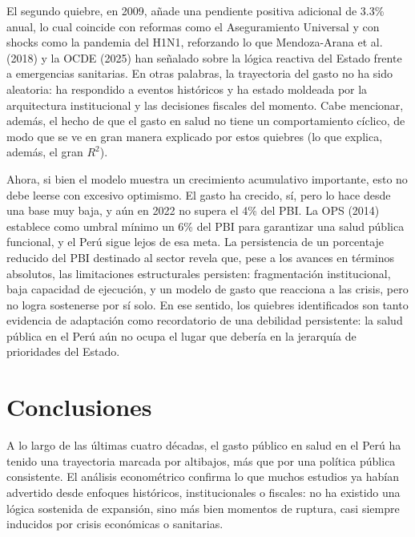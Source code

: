 \documentclass[12pt]{article}
\begin{document}
El segundo quiebre, en 2009, añade una pendiente positiva adicional de 3.3\% anual, lo cual coincide con reformas como el Aseguramiento Universal y con shocks como la pandemia del H1N1, reforzando lo que Mendoza-Arana et al. (2018) y la OCDE (2025) han señalado sobre la lógica reactiva del Estado frente a emergencias sanitarias. En otras palabras, la trayectoria del gasto no ha sido aleatoria: ha respondido a eventos históricos y ha estado moldeada por la arquitectura institucional y las decisiones fiscales del momento. Cabe mencionar, además, el hecho de que el gasto en salud no tiene un comportamiento cíclico, de modo que se ve en gran manera explicado por estos quiebres (lo que explica, además, el gran $R^2$). 

Ahora, si bien el modelo muestra un crecimiento acumulativo importante, esto no debe leerse con excesivo optimismo. El gasto ha crecido, sí, pero lo hace desde una base muy baja, y aún en 2022 no supera el 4\% del PBI. La OPS (2014) establece como umbral mínimo un 6\% del PBI para garantizar una salud pública funcional, y el Perú sigue lejos de esa meta. La persistencia de un porcentaje reducido del PBI destinado al sector revela que, pese a los avances en términos absolutos, las limitaciones estructurales persisten: fragmentación institucional, baja capacidad de ejecución, y un modelo de gasto que reacciona a las crisis, pero no logra sostenerse por sí solo. En ese sentido, los quiebres identificados son tanto evidencia de adaptación como recordatorio de una debilidad persistente: la salud pública en el Perú aún no ocupa el lugar que debería en la jerarquía de prioridades del Estado.

\section{Conclusiones}

A lo largo de las últimas cuatro décadas, el gasto público en salud en el Perú ha tenido una trayectoria marcada por altibajos, más que por una política pública consistente. El análisis econométrico confirma lo que muchos estudios ya habían advertido desde enfoques históricos, institucionales o fiscales: no ha existido una lógica sostenida de expansión, sino más bien momentos de ruptura, casi siempre inducidos por crisis económicas o sanitarias.
\end{document}
